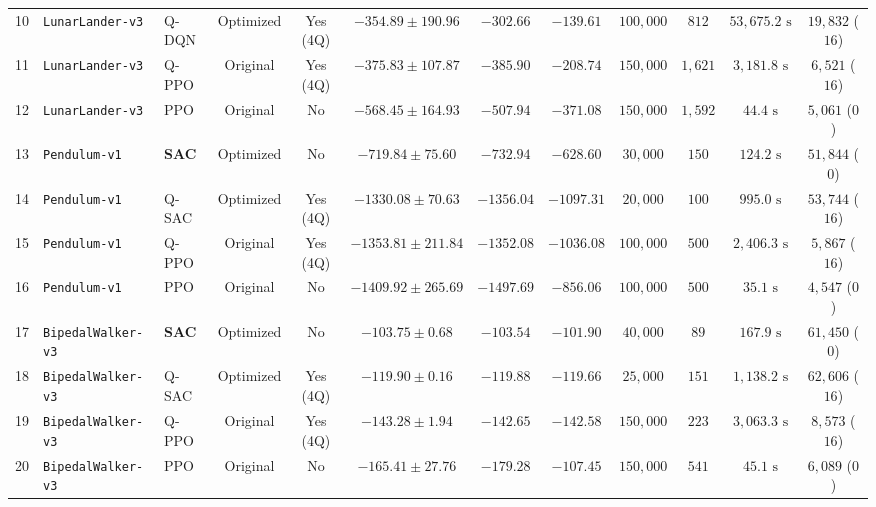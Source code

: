 \documentclass[conference]{IEEEtran}
\begin{document}
\begin{table}[t]
{\begin{tabular}{cllccccccccc}
10 & \texttt{LunarLander-v3} & Q-DQN & Optimized & Yes (4Q) & $-354.89 \pm 190.96$ & $-302.66$ & $-139.61$ & $100,000$ & $812$ & $53,675.2\text{ s}$ & $19,832$ ($16$) \\
11 & \texttt{LunarLander-v3} & Q-PPO & Original & Yes (4Q) & $-375.83 \pm 107.87$ & $-385.90$ & $-208.74$ & $150,000$ & $1,621$ & $3,181.8\text{ s}$ & $6,521$ ($16$) \\
12 & \texttt{LunarLander-v3} & PPO & Original & No & $-568.45 \pm 164.93$ & $-507.94$ & $-371.08$ & $150,000$ & $1,592$ & $44.4\text{ s}$ & $5,061$ ($0$) \\
\midrule
13 & \texttt{Pendulum-v1} & \textbf{SAC} & Optimized & No & $\mathbf{-719.84 \pm 75.60}$ & $-732.94$ & $\mathbf{-628.60}$ & $30,000$ & $150$ & $124.2\text{ s}$ & $51,844$ ($0$) \\
14 & \texttt{Pendulum-v1} & Q-SAC & Optimized & Yes (4Q) & $-1330.08 \pm 70.63$ & $-1356.04$ & $-1097.31$ & $20,000$ & $100$ & $995.0\text{ s}$ & $53,744$ ($16$) \\
15 & \texttt{Pendulum-v1} & Q-PPO & Original & Yes (4Q) & $-1353.81 \pm 211.84$ & $-1352.08$ & $-1036.08$ & $100,000$ & $500$ & $2,406.3\text{ s}$ & $5,867$ ($16$) \\
16 & \texttt{Pendulum-v1} & PPO & Original & No & $-1409.92 \pm 265.69$ & $-1497.69$ & $-856.06$ & $100,000$ & $500$ & $35.1\text{ s}$ & $4,547$ ($0$) \\
\midrule
17 & \texttt{BipedalWalker-v3} & \textbf{SAC} & Optimized & No & $\mathbf{-103.75 \pm 0.68}$ & $-103.54$ & $\mathbf{-101.90}$ & $40,000$ & $89$ & $167.9\text{ s}$ & $61,450$ ($0$) \\
18 & \texttt{BipedalWalker-v3} & Q-SAC & Optimized & Yes (4Q) & $-119.90 \pm 0.16$ & $-119.88$ & $-119.66$ & $25,000$ & $151$ & $1,138.2\text{ s}$ & $62,606$ ($16$) \\
19 & \texttt{BipedalWalker-v3} & Q-PPO & Original & Yes (4Q) & $-143.28 \pm 1.94$ & $-142.65$ & $-142.58$ & $150,000$ & $223$ & $3,063.3\text{ s}$ & $8,573$ ($16$) \\
20 & \texttt{BipedalWalker-v3} & PPO & Original & No & $-165.41 \pm 27.76$ & $-179.28$ & $-107.45$ & $150,000$ & $541$ & $45.1\text{ s}$ & $6,089$ ($0$) \\
\bottomrule
\end{tabular}%
}
\end{table}
\end{document}
